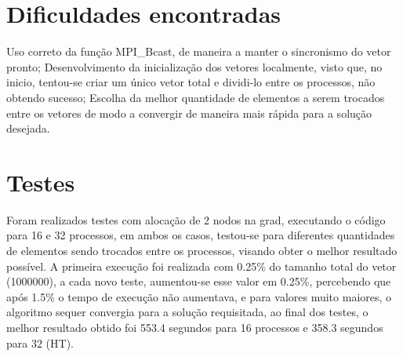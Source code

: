 \documentclass{article}
\begin{document}
\begin{multicols*}{2}
\section{Dificuldades encontradas}
Uso correto da função MPI\_Bcast, de maneira a manter o sincronismo do vetor pronto; Desenvolvimento da inicialização dos vetores localmente, visto que, no inicio, tentou-se criar um único vetor total e dividi-lo entre os processos, não obtendo sucesso; Escolha da melhor quantidade de elementos a serem trocados entre os vetores de modo a convergir de maneira mais rápida para a solução desejada.  
\section{Testes}
Foram realizados testes com alocação de 2 nodos na grad, executando o código para 16 e 32 processos, em ambos os casos, testou-se para diferentes quantidades de elementos sendo trocados entre os processos, visando obter o melhor resultado possível. A primeira execução foi realizada com 0.25\% do tamanho total do vetor (1000000), a cada novo teste, aumentou-se esse valor em 0.25\%, percebendo que após 1.5\% o tempo de execução não aumentava, e para valores muito maiores, o algoritmo sequer convergia para a solução requisitada, ao final dos testes, o melhor resultado obtido foi 553.4 segundos para 16 processos e 358.3 segundos para 32 (HT).

\end{multicols*}
\end{document}
